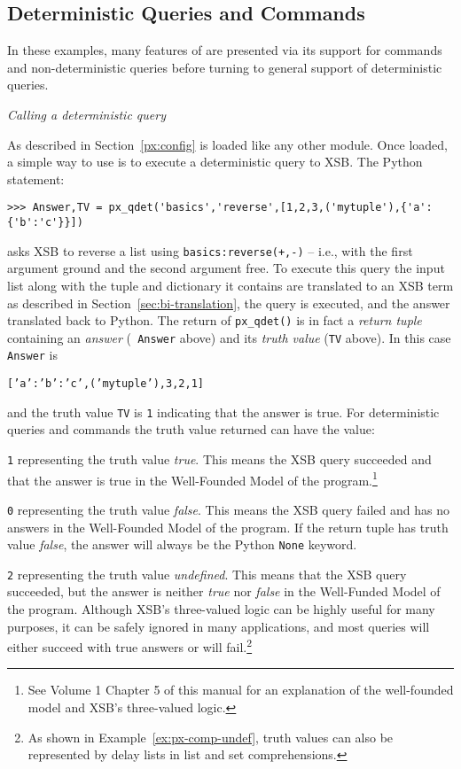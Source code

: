 \subsection{Deterministic Queries and Commands} \label{sec:pxdet}

In these examples, many features of \px{} are presented via its
support for commands and non-deterministic queries before turning to
general support of deterministic queries.

\begin{example} \rm
{\em Calling a deterministic query}
  
  As described in Section~\ref{px:config} \px{} is loaded like any
  other module.  Once loaded, a simple way to use \px{} is to
  execute a deterministic query to XSB.  The Python statement:

\begin{verbatim}  
>>> Answer,TV = px_qdet('basics','reverse',[1,2,3,('mytuple'),{'a':{'b':'c'}}])
\end{verbatim}

\noindent
  asks XSB to reverse a list using {\tt basics:reverse(+,-)} -- i.e.,
  with the first argument ground and the second argument free.  To
  execute this query the input list along with the tuple and
  dictionary it contains are translated to an XSB term as described in
  Section~\ref{sec:bi-translation}, the query is executed, and the
  answer translated back to Python.  The return of {\tt px\_qdet()} is
  in fact a {\em return tuple} containing an {\em answer} ({\tt
    Answer} above) and its {\em truth value} ({\tt TV} above).  In this
    case {\tt Answer} is

  {\tt [{'a':{'b':'c'}},('mytuple'),3,2,1]}

\noindent    
and the truth value {\tt TV} is {\tt 1} indicating that the answer is
true.  For deterministic queries and commands the truth value returned
can have the value:

\bi
\item {\tt 1} representing the truth value {\em true}.  This means the
  XSB query succeeded and that the answer is true in the Well-Founded
  Model of the program.\footnote{See Volume 1 Chapter 5 of this manual
    for an explanation of the well-founded model and XSB's
    three-valued logic.}
\item {\tt 0} representing the truth value {\em false}.  This means
  the XSB query failed and has no answers in the Well-Founded Model of
  the program.  If the return tuple has truth value {\em false}, the answer
  will always be the Python {\tt None} keyword.
\item {\tt 2} representing the truth value {\em undefined}. This means
  that the XSB query succeeded, but the answer is neither {\em true} nor
  {\em false} in the Well-Funded Model of the program.  \ei
\noindent
Although XSB's three-valued logic can be highly useful for many
purposes, it can be safely ignored in many applications, and most
queries will either succeed with true answers or will
fail.\footnote{As shown in Example~\ref{ex:px-comp-undef}, truth
  values can also be represented by delay lists in list and set
  comprehensions.}


\end{example}

